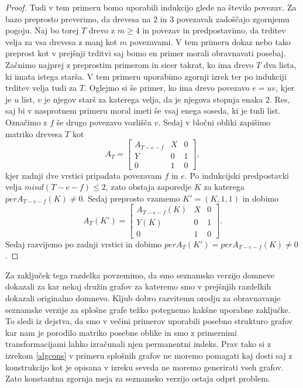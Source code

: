 \documentclass[12pt,a4paper,twoside]{article}
\theoremstyle{definition} %
\theoremstyle{plain} %
\numberwithin{equation}{section}  %
\begin{document}
\begin{proof}
Tudi v tem primeru bomo uporabili indukcijo glede na število povezav. Za bazo preprosto preverimo, da drevesa na $2$ in $3$ povezavah zadoščajo zgornjemu pogoju. Naj bo torej $T$ drevo z $m \ge 4$ in povezav in predpostavimo, da trditev velja za vsa drevesa z manj kot $m$ povezavami. V tem primeru dokaz nebo tako preprost kot v prejšnji trditvi saj bomo en primer morali obravnavati posebaj. Začnimo najprej z preprostim primerom in sicer takrat, ko ima drevo $T$ dva lista, ki imata istega starša. V tem primeru uporabimo zgornji izrek ter po indukciji trditev velja tudi za $T$. Oglejmo si še primer, ko ima drevo povezavo $e=uv$, kjer je $u$ list, $v$ je njegov starš za katerega velja, da je njegova stopnja enaka $2$. Res, saj bi v nasprotnem primeru moral imeti še vsaj enega soseda, ki je tudi list. Označimo z $f$ še drugo povezavo vozlišča $v$. Sedaj v bločni obliki zapišimo matriko drevesa $T$ kot
$$ A_T = \left[ \begin{matrix}
 A_{T-e-f}& X & 0 \\
 Y & 0 & 1 \\
0 & 1 & 0 
\end{matrix} \right] ,$$
kjer zadnji dve vrstici pripadata povezavam $f$ in $e$. Po indukcijski predpostavki velja $mind(T-e-f) \le 2$, zato obstaja zaporedje $K$ za katerega $perA_{T-e-f}(K) \neq0$. Sedaj preprosto vzamemo $K' = (K, 1, 1)$ in dobimo
$$ A_T(K') = \left[ \begin{matrix}
 A_{T-e-f}(K)& X & 0 \\
 Y(K) & 0 & 1 \\
0 & 1 & 0 
\end{matrix} \right] .$$
Sedaj razvijemo po zadnji vrstici in dobimo $perA_T(K') = perA_{T-e-f}(K) \neq 0$.
 \end{proof}

Za zaključek tega razdelka povzemimo, da smo seznamsko verzijo domneve dokazali za kar nekaj družin grafov za kateremo smo v prejšnjih razdelkih dokazali originalno domnevo. Kljub dobro razvitemu orodju za obravnavanje seznamske verzije za splošne grafe težko potegnemo kakšne uporabne zaključke. To sledi iz dejstva, da smo v večini primerov uporabili posebno strukturo grafov kar nam je porodilo matriko posebne oblike in smo z primernimi transformacijami lahko izračunali njen permanentni indeks. Prav tako si z izrekom \ref{algcons} v primeru splošnih grafov ne moremo pomagati kaj dosti saj z konstrukcijo kot je opisana v izreku seveda ne moremo generirati vseh grafov. Zato konstantna zgornja meja za seznamsko verzijo ostaja odprt problem.
\end{document}
